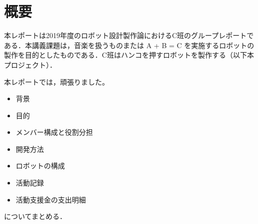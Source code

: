 \section{概要}
本レポートは2019年度のロボット設計製作論におけるC班のグループレポートである．本講義課題は，音楽を扱うものまたは A + B = C を実施するロボットの製作を目的としたものである．C班はハンコを押すロボットを製作する（以下本プロジェクト）．


本レポートでは，頑張りました。
\begin{itemize}
	\item 背景
	\item 目的
	\item メンバー構成と役割分担
	\item 開発方法
	\item ロボットの構成
	\item 活動記録
	\item 活動支援金の支出明細
\end{itemize}

についてまとめる．